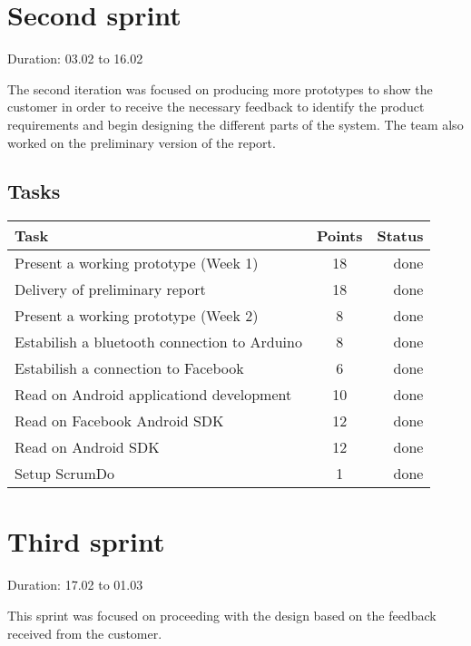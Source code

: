 \section{Second sprint}

Duration: 03.02 to 16.02

The second iteration was focused on producing more prototypes to
show the customer in order to receive the necessary feedback to identify
the product requirements and begin designing the different parts of the system.
The team also worked on the preliminary version of the report.

\subsection{Tasks}

\begin{table}
\begin{tabular}{ | l | c | r | }

\hline
\textbf{Task} & \textbf{Points} & \textbf{Status} \\
\hline

Present a working prototype	(Week 1)			& 18 & done \\
\hline
Delivery of preliminary report					& 18 & done \\
\hline
Present a working prototype	(Week 2)			& 8  & done \\
\hline
Estabilish a bluetooth connection to Arduino	& 8  & done \\
\hline
Estabilish a connection to Facebook				& 6  & done \\
\hline
Read on Android applicationd development		& 10 & done \\
\hline
Read on Facebook Android SDK					& 12 & done \\
\hline
Read on Android SDK								& 12 & done \\
\hline
Setup ScrumDo									& 1  & done \\
\hline

\end{tabular}
\end{table}

\section{Third sprint}

Duration: 17.02 to 01.03

This sprint was focused on proceeding with the design based on the
feedback received from the customer.

